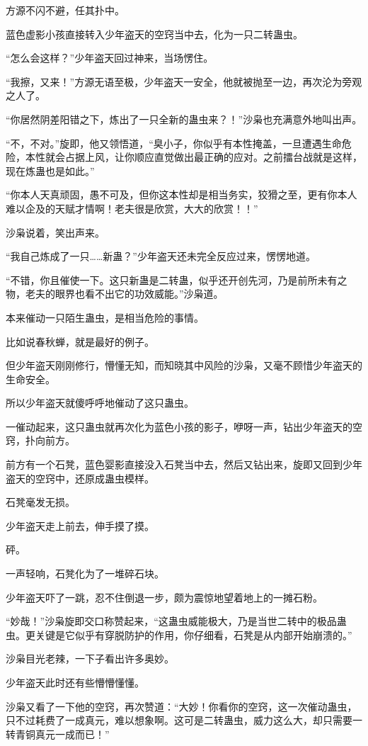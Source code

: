 \begin{this_body}
方源不闪不避，任其扑中。

蓝色虚影小孩直接转入少年盗天的空窍当中去，化为一只二转蛊虫。

“怎么会这样？”少年盗天回过神来，当场愣住。

“我擦，又来！”方源无语至极，少年盗天一安全，他就被抛至一边，再次沦为旁观之人了。

“你居然阴差阳错之下，炼出了一只全新的蛊虫来？！”沙枭也充满意外地叫出声。

“不，不对。”旋即，他又领悟道，“臭小子，你似乎有本性掩盖，一旦遭遇生命危险，本性就会占据上风，让你顺应直觉做出最正确的应对。之前擂台战就是这样，现在炼蛊也是如此。”

“你本人天真顽固，愚不可及，但你这本性却是相当务实，狡猾之至，更有你本人难以企及的天赋才情啊！老夫很是欣赏，大大的欣赏！！”

沙枭说着，笑出声来。

“我自己炼成了一只……新蛊？”少年盗天还未完全反应过来，愣愣地道。

“不错，你且催使一下。这只新蛊是二转蛊，似乎还开创先河，乃是前所未有之物，老夫的眼界也看不出它的功效威能。”沙枭道。

本来催动一只陌生蛊虫，是相当危险的事情。

比如说春秋蝉，就是最好的例子。

但少年盗天刚刚修行，懵懂无知，而知晓其中风险的沙枭，又毫不顾惜少年盗天的生命安全。

所以少年盗天就傻呼呼地催动了这只蛊虫。

一催动起来，这只蛊虫就再次化为蓝色小孩的影子，咿呀一声，钻出少年盗天的空窍，扑向前方。

前方有一个石凳，蓝色婴影直接没入石凳当中去，然后又钻出来，旋即又回到少年盗天的空窍中，还原成蛊虫模样。

石凳毫发无损。

少年盗天走上前去，伸手摸了摸。

砰。

一声轻响，石凳化为了一堆碎石块。

少年盗天吓了一跳，忍不住倒退一步，颇为震惊地望着地上的一摊石粉。

“妙哉！”沙枭旋即交口称赞起来，“这蛊虫威能极大，乃是当世二转中的极品蛊虫。更关键是它似乎有穿脱防护的作用，你仔细看，石凳是从内部开始崩溃的。”

沙枭目光老辣，一下子看出许多奥妙。

少年盗天此时还有些懵懵懂懂。

沙枭又看了一下他的空窍，再次赞道：“大妙！你看你的空窍，这一次催动蛊虫，只不过耗费了一成真元，难以想象啊。这可是二转蛊虫，威力这么大，却只需要一转青铜真元一成而已！”


\end{this_body}
